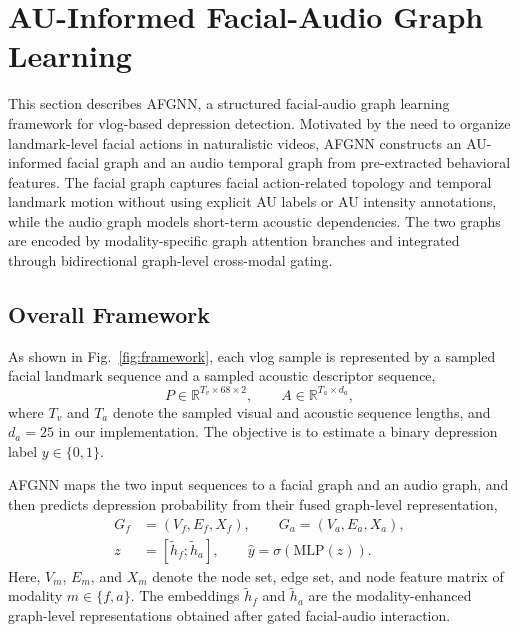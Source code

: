 \documentclass[conference]{IEEEtran}
\begin{document}
\section{AU-Informed Facial-Audio Graph Learning}
\label{sec:method}
This section describes AFGNN, a structured facial-audio graph learning framework for vlog-based depression detection. Motivated by the need to organize landmark-level facial actions in naturalistic videos, AFGNN constructs an AU-informed facial graph and an audio temporal graph from pre-extracted behavioral features. The facial graph captures facial action-related topology and temporal landmark motion without using explicit AU labels or AU intensity annotations, while the audio graph models short-term acoustic dependencies. The two graphs are encoded by modality-specific graph attention branches and integrated through bidirectional graph-level cross-modal gating.

\subsection{Overall Framework}

As shown in Fig.~\ref{fig:framework}, each vlog sample is represented by a sampled facial landmark sequence and a sampled acoustic descriptor sequence,
\begin{equation}
P\in\mathbb{R}^{T_v\times 68\times 2},\qquad
A\in\mathbb{R}^{T_a\times d_a},
\label{eqinput}
\end{equation}
where $T_v$ and $T_a$ denote the sampled visual and acoustic sequence lengths, and $d_a=25$ in our implementation. The objective is to estimate a binary depression label $y\in\{0,1\}$.

AFGNN maps the two input sequences to a facial graph and an audio graph, and then predicts depression probability from their fused graph-level representation,
\begin{equation}
\begin{aligned}
G_f&=(V_f,E_f,X_f),\qquad
G_a=(V_a,E_a,X_a),\\
z&=[\tilde{h}_f;\tilde{h}_a],\qquad
\hat{y}=\sigma(\mathrm{MLP}(z)).
\end{aligned}
\label{eqoverallmapping}
\end{equation}
Here, $V_m$, $E_m$, and $X_m$ denote the node set, edge set, and node feature matrix of modality $m\in\{f,a\}$. The embeddings $\tilde{h}_f$ and $\tilde{h}_a$ are the modality-enhanced graph-level representations obtained after gated facial-audio interaction.
\end{document}
